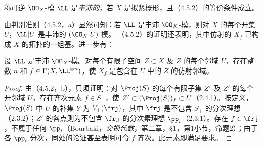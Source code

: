 称可逆 $\OO_X$-模 $\LL$ 是\emph{丰沛的}，若 $X$ 是拟紧概形，且（4.5.2）的等价条件成立。

由判别准则（4.5.2，a）显然可知：若 $\LL$ 是丰沛 $\OO_X$-模，则对 $X$ 的每个开集 $U$，$\LL|U$ 是丰沛的 $(\OO_X|U)$-模。
（4.5.2）的证明还表明，其中仿射的 $X_f$ 已构成 $X$ 的拓扑的一组基。进一步有：

设 $\LL$ 是丰沛 $\OO_X$-模。对每个有限子空间 $Z\subset X$ 及 $Z$ 的每个邻域 $U$，存在整数 $n$ 和 $f\in\Gamma(X,\LL^{\otimes n})$，使 $X_f$ 是包含在 $U$ 中的 $Z$ 的仿射邻域。
\begin{proof}
由（4.5.2，b），只须证明：对 $\Proj(S)$ 的每个有限子集 $Z'$ 及 $Z'$ 的每个开邻域 $U$，存在齐次元素 $f\in S_+$，使 $Z'\subset(\Proj(S))_f\subset U$（2.4.1）。按定义，$\Proj(S)$ 中 $U$ 的补集 $Y$ 为 $V_+(\frj)$，其中 $\frj$ 是不包含 $S_+$ 的分次理想（2.3.2）；$Z'$ 的各点则为不包含 $\frj$ 的分次素理想 $\pp_i$（2.3.1）。存在 $f\in\frj$，不属于任何 $\pp_i$（Bourbaki，\textit{交换代数}，第二章，§1，第1小节，命题2）；由于各 $\pp_i$ 分次，同处的论证甚至表明可令 $f$ 齐次。此元素即满足要求。
\end{proof}

